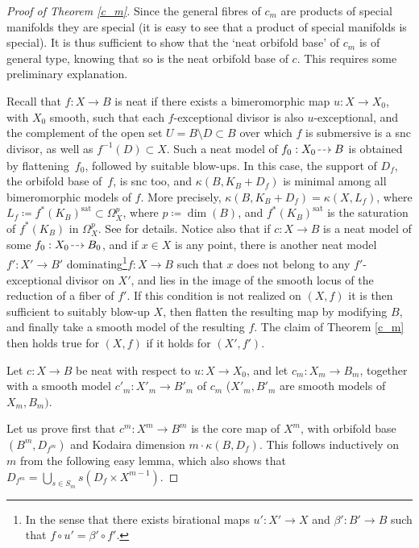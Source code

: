 \documentclass[JEP,XML,SOM,Unicode, NoEqCountersInSection,NoFloatCountersInSection,published]{cedram}
\newcommand{\sat}{\mathrm{sat}}
\newcommand{\dradpl}{{\hspace*{-2.5mm}\begin{tikzcd}[ampersand replacement=\&,column sep = scriptsize]\mbox{}\ar[r,dashed]\&\mbox{}\end{tikzcd}\hspace*{-2.5mm}}}
\newcommand{\dratst}{{\hspace*{-2.5mm}\begin{tikzcd}[ampersand replacement=\&,column sep = small]\mbox{}\ar[r,dashed]\&\mbox{}\end{tikzcd}\hspace*{-2mm}}}
\let\drascst\dratst
\newcommand{\dra}{\mathchoice{\dradpl}{\dratst}{\drascst}{\drascst}}
\let\dasharrow\dra
\theoremstyle{theorem}
\theoremstyle{definition}
\begin{document}
\begin{proof} [Proof of Theorem \ref{c_m}] Since the general fibres of $c_m$ are products of special manifolds they are special (it is easy to see that a product of special manifolds is special). It is thus sufficient to show that the `neat orbifold base' of $c_m$ is of general type, knowing that so is the neat orbifold base of $c$. This requires some preliminary explanation.

Recall that $f:X\to B$ is neat if there exists a bimeromorphic map $u:X\to X_0$, with $X_0$ smooth, such that each $f$-exceptional divisor is also $u$-exceptional, and the complement of the open set $U=B\setminus D\subset B$ over which $f$ is submersive is a snc divisor, as well as $f^{-1}(D)\subset X$. Such a neat model of $f_0:X_0\dasharrow B$ is obtained by flattening~$f_0$, followed by suitable blow-ups. In this case, the support of $D_f$, the orbifold base of~$f$, is snc too, and $\kappa(B,K_B+D_f)$ is minimal among all bimeromorphic models of $f$. More precisely, $\kappa(B, K_B+D_f)=\kappa(X,L_f)$, where $L_f\coloneqq f^*(K_B)^{\sat}\subset \Omega^p_X$, where $p\coloneqq \dim(B)$, and $f^*(K_B)^{\sat}$ is the saturation of $f^*(K_B)$ in $\Omega^p_X$. See \cite{Cam04} for details. Notice also that if $c:X\to B$ is a neat model of some $f_0:X_0\dasharrow B_0$, and if $x\in X$ is any point, there is another neat model $f':X'\to B'$ dominating\footnote{In the sense that there exists birational maps $u':X'\to X$ and $\beta':B'\to B$ such that $f\circ u'=\beta'\circ f'$.}$f:X\to B$ such that $x$ does not belong to any $f'$-exceptional divisor on $X'$, and lies in the image of the smooth locus of the reduction of a fiber of $f'$. If this condition is not realized on $(X,f)$ it is then sufficient to suitably blow-up $X$, then flatten the resulting map by modifying $B$, and finally take a smooth model of the resulting $f$. The claim of Theorem \ref{c_m} then holds true for $(X,f)$ if it holds for $(X',f')$.

Let $c:X\to B$ be neat with respect to $u:X\to X_0$, and let $c_m:X_m\to B_m$, together with a smooth model $c'_m:X'_m\to B'_m$ of $c_m$ (\ie $X'_m, B'_m$ are smooth models of $X_m,B_m)$.

Let us prove first that $c^m:X^m\to B^m$ is the core map of $X^m$, with orbifold base $(B^m,D_{f^m})$ and Kodaira dimension $m\cdot \kappa(B,D_f)$. This follows inductively on $m$ from the following easy lemma, which also shows that $D_{f^m}=\bigcup_{s\in S_m}s(D_f\times X^{m-1})$.


\end{proof}
\end{document}
